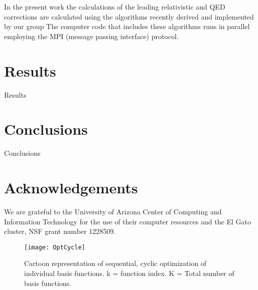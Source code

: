 \documentclass[aps,onecolumn]{revtex4}
\begin{document}
In the present work the calculations of the leading
relativistic and QED corrections are calculated using 
the algorithms recently derived and implemented by our group \cite{ms1,ms2,ms3}
The computer code that includes these algorithms runs in parallel
employing the MPI (message passing interface) protocol.

\section{Results}
\label{Results}
Results

\section{Conclusions}
Conclusions

\section{Acknowledgements}
We are grateful to the University of Arizona Center of Computing and Information Technology
for the use of their computer resources and the El Gato cluster, NSF grant number 1228509.

\newpage



\newpage

\begin{figure}
\caption{Cartoon representation of sequential, cyclic optimization of individual basis functions.
k = function index. K = Total number of basis functions.}
\texttt{[image: OptCycle]}
\label{OptCyc}
\end{figure}
\end{document}
